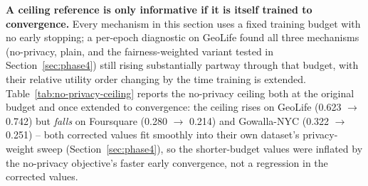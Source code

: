 \textbf{A ceiling reference is only informative if it is itself trained
to convergence.} Every mechanism in this section uses a fixed training
budget with no early stopping; a per-epoch diagnostic on GeoLife found
all three mechanisms (no-privacy, plain, and the fairness-weighted
variant tested in Section~\ref{sec:phase4}) still rising substantially
partway through that budget, with their relative utility order changing
by the time training is extended. Table~\ref{tab:no-privacy-ceiling}
reports the no-privacy ceiling both at the original budget and once
extended to convergence: the ceiling rises on GeoLife (0.623 $\to$
0.742) but \emph{falls} on Foursquare (0.280 $\to$ 0.214) and
Gowalla-NYC (0.322 $\to$ 0.251) -- both corrected values fit smoothly
into their own dataset's privacy-weight sweep (Section~\ref{sec:phase4}),
so the shorter-budget values were inflated by the no-privacy
objective's faster early convergence, not a regression in the corrected
values.


